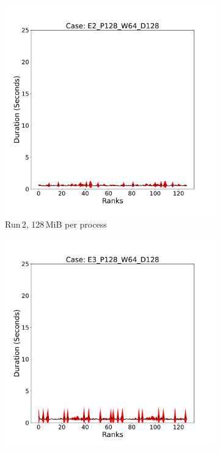 \begin{figure}
\begin{subfigure}[b]{0.3\textwidth}
         \includegraphics[width=\textwidth, height=\textwidth]{figures/deisa1__E2_P128_W64_D128.pdf}
         \caption{Run\,2, 128\,MiB per process}
         \label{fig:E2_128_d11}
     \end{subfigure}
      \hfill
     \begin{subfigure}[b]{0.3\textwidth}
         \centering
         \includegraphics[width=\textwidth, height=\textwidth]{figures/deisa1__E3_P128_W64_D128.pdf}

\end{subfigure}
\end{figure}
